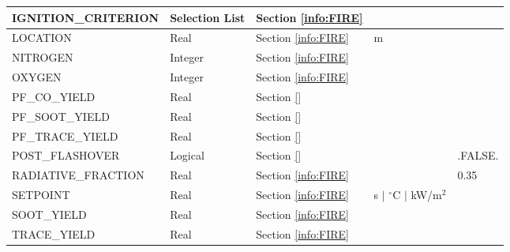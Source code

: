 \begin{longtable}{@{\extracolsep{\fill}}|l|l|l|l|l|}
{\ct IGNITION\_CRITERION}  & Selection List         & Section \ref{info:FIRE}                 &                             &                 \\ \hline
{\ct LOCATION}        & Real        & Section \ref{info:FIRE}                 & m                           &                 \\ \hline
{\ct NITROGEN}             & Integer     & Section \ref{info:FIRE}                 &                             &                 \\ \hline
{\ct OXYGEN}               & Integer     & Section \ref{info:FIRE}                 &                             &                 \\ \hline
{\ct PF\_CO\_YIELD}        & Real        & Section \ref{}                 &                             &                 \\ \hline
{\ct PF\_SOOT\_YIELD}      & Real        & Section \ref{}                 &                             &                 \\ \hline
{\ct PF\_TRACE\_YIELD}     & Real        & Section \ref{}                 &                             &                 \\ \hline
{\ct POST\_FLASHOVER}      & Logical     & Section \ref{}                 &                             &    {\ct .FALSE.}    \\ \hline
{\ct RADIATIVE\_FRACTION}  & Real        & Section \ref{info:FIRE}                 &                             &     0.35        \\ \hline
{\ct SETPOINT}             & Real        & Section \ref{info:FIRE}                 & s $\mid$ $^\circ$C $\mid$ kW/m$^2$  &                 \\ \hline
{\ct SOOT\_YIELD}          & Real        & Section \ref{info:FIRE}                 &                             &                 \\ \hline
{\ct TRACE\_YIELD}         & Real        & Section \ref{info:FIRE}                 &                             &                 \\ \hline
\end{longtable}


